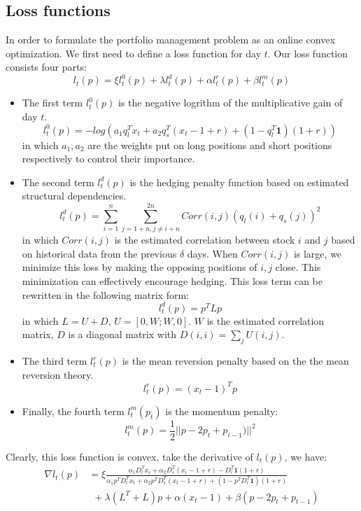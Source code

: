 \subsection{Loss functions}

    \noindent In order to formulate the portfolio management problem as an online convex optimization. We first need to define a loss function for day $t$. Our loss function consists four parts:
    $$l_t(p) = \xi l_t^{0}(p) + \lambda l_t^{d}(p) + \alpha l_t^{r}(p) + \beta l_t^{m}(p)$$

    \begin{itemize}

        \item The first term $l_t^0(p)$ is the negative logrithm of the multiplicative gain of day $t$.
            $$l_t^{0}(p) = -log(a_1q_l^Tx_t + a_2q_s^T(x_t-1+r) + (1-q_l^T\textbf{1})(1+r))$$
            in which $a_1, a_2$ are the weights put on long positions and short positions respectively to control their importance.\\

        \item The second term $l_t^d(p)$ is the hedging penalty function based on estimated structural dependencies.
            $$l_t^{d}(p) = \sum_{i=1}^n\sum_{j=1+n, j\neq i+n}^{2n} Corr(i,j)(q_l(i)+q_s(j))^2$$
            in which $Corr(i,j)$ is the estimated correlation between stock $i$ and $j$ based on historical data from the previous $\delta$ days. When $Corr(i,j)$ is large, we minimize this loss by making the opposing positions of $i,j$ close. This minimization can effectively encourage hedging. This loss term can be rewritten in the following matrix form:
            $$l_t^{d}(p) = p^TLp$$
            in which $L=U+D$, $U = [0, W; W, 0]$. $W$ is the estimated correlation matrix, $D$ is a diagonal matrix with $D(i,i)=\sum_j U(i,j)$.

        \item The third term $l_t^r(p)$ is the mean reversion penalty based on the the mean reversion theory.
            $$l_t^r(p)=(x_{t} - 1)^Tp$$

        \item Finally, the fourth term $l_t^m(p_t)$ is the momentum penalty:
            $$l_t^m(p)=\frac{1}{2}||p-2p_{t}+p_{t-1})||^2$$

    \end{itemize}


    \noindent Clearly, this loss function is convex, take the derivative of $l_t(p)$, we have:
\begin{align}\nonumber
\nabla l_t(p) & = \xi \frac{\alpha_1D_l^Tx_t+\alpha_2D_s^T(x_t-1+r)-D_l^T\textbf{1}(1+r)}{\alpha_1p^TD_l^Tx_t+\alpha_2p^TD_s^T(x_t-1+r)+(1-p^TD_l^T\textbf{1})(1+r)} \\ &\  \ + \lambda (L^T+L)p + \alpha (x_{t}-1) + \beta (p - 2p_{t} + p_{t-1})
\end{align}

